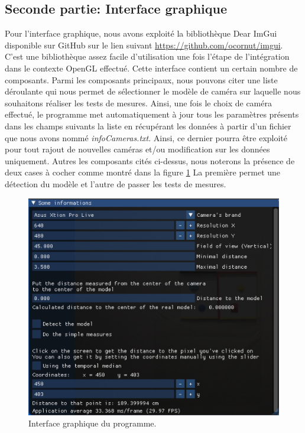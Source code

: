 \documentclass[a4paper, 12pt]{book}
\newcounter{program}[subsection]
\begin{document}
\subsection{Seconde partie: Interface graphique}
Pour l'interface graphique, nous avons exploité la bibliothèque Dear ImGui disponible sur GitHub sur le lien suivant \url{https://github.com/ocornut/imgui}. C'est une bibliothèque assez facile d'utilisation une fois l'étape de l'intégration dans le contexte OpenGL effectué. Cette interface contient un certain nombre de composants. Parmi les composants principaux, nous pouvons citer une liste déroulante qui nous permet de sélectionner le modèle de caméra sur laquelle nous souhaitons réaliser les tests de mesures. Ainsi, une fois le choix de caméra effectué, le programme met automatiquement à jour tous les paramètres présents dans les champs suivants la liste en récupérant les données à partir d'un fichier que nous avons nommé \emph{infoCameras.txt}. Ainsi, ce dernier pourra être exploité pour tout rajout de nouvelles caméras et/ou modification sur les données uniquement.
Autres les composants cités ci-dessus, nous noterons la présence de deux cases à cocher comme montré dans la figure \ref{fig-gui} La première permet une détection du modèle et l'autre de passer les tests de mesures.
\begin{figure}[htbp]
  \hspace{3.5cm}
 \includegraphics[scale=0.5]{images/GUI.png} \hspace{2cm}
  \caption{Interface graphique du programme.\label{fig-gui}}
\end{figure}
\end{document}
